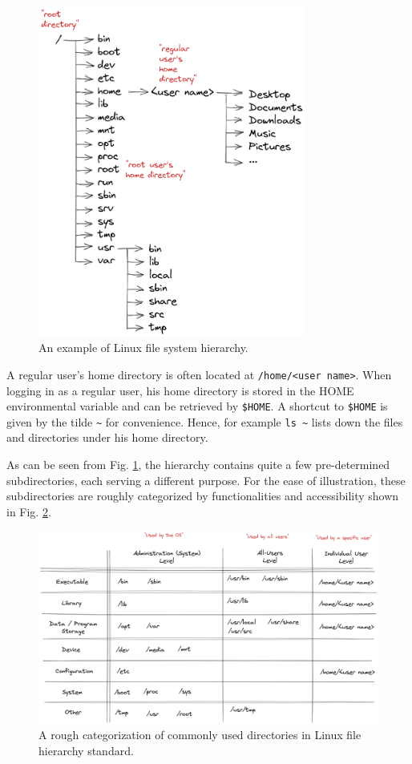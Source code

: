 \begin{figure}[!htb]
	\centering
	\includegraphics[width=250pt]{chapters/part-1/figures/linux_file_hierarchy.png}
	\caption{An example of Linux file system hierarchy.} \label{ch:fm:fig:hierarchy}
\end{figure}

A regular user's home directory is often located at \verb|/home/<user name>|. When logging in as a regular user, his home directory is stored in the HOME environmental variable and can be retrieved by \verb|$HOME|. A shortcut to \verb|$HOME| is given by the tilde \verb|~| for convenience. Hence, for example \verb|ls ~| lists down the files and directories under his home directory.

As can be seen from Fig. \ref{ch:fm:fig:hierarchy}, the hierarchy contains quite a few pre-determined subdirectories, each serving a different purpose. For the ease of illustration, these subdirectories are roughly categorized by functionalities and accessibility shown in Fig. \ref{ch:fm:fig:directorycate}.

\begin{figure}[!htb]
	\centering
	\includegraphics[width=350pt]{chapters/part-1/figures/linux_directory_cate.png}
	\caption{A rough categorization of commonly used directories in Linux file hierarchy standard.} \label{ch:fm:fig:directorycate}
\end{figure}

